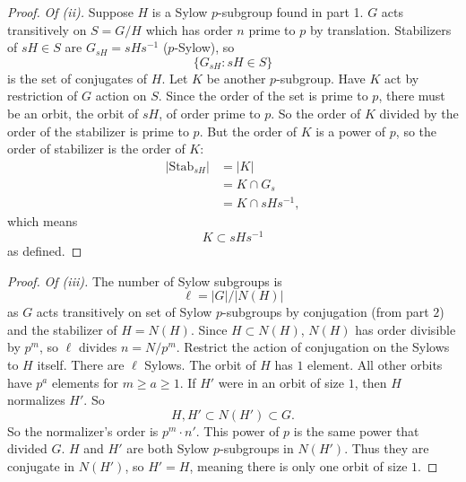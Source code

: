\documentclass[11pt, oneside]{amsart}
\numberwithin{equation}{section}
\numberwithin{theorem}{section}
\theoremstyle{definition}
\begin{document}
{\begin{proof} 
\textit{Of (ii).} Suppose $H$ is a Sylow $p$-subgroup found in part 1. $G$ acts transitively on $S=G/H$ which has order $n$ prime to $p$ by translation. Stabilizers of $sH\in S$ are $G_{sH} = sHs^{-1}$ ($p$-Sylow), so 
$$
\{ G_{sH} : sH\in S \}
$$
is the set of conjugates of $H$. Let $K$ be another $p$-subgroup. Have $K$ act by restriction of $G$ action on $S$. Since the order of the set is prime to $p$, there must be an orbit, the orbit of $sH$, of order prime to $p$. So the order of $K$ divided by the order of the stabilizer is prime to $p$. But the order of $K$ is a power of $p$, so the order of stabilizer is the order of $K$:
\begin{align*}
|\textrm{Stab}_{sH}| 	&= |K|\\
				&= K\cap G_s\\
				&= K \cap sHs^{-1},
\end{align*}
which means 
$$
K \subset sHs^{-1}
$$
as defined.
\end{proof}

\begin{proof} 
\textit{Of (iii).} The number of Sylow subgroups is
$$
\ell = |G| / |N(H)|
$$ 
as $G$ acts transitively on set of Sylow $p$-subgroups by conjugation (from part $2$) and the stabilizer of $H=N(H)$. Since $H\subset N(H)$, $N(H)$ has order divisible by $p^m$, so $\ell$ divides $n = N/p^m$. Restrict the action of conjugation on the Sylows to $H$ itself. There are $\ell$ Sylows. The orbit of $H$ has $1$ element. All other orbits have $p^a$ elements for $m\geqslant a\geqslant 1$. If $H'$ were in an orbit of size $1$, then $H$ normalizes $H'$. So 
$$
H, H' \subset N(H')\subset G.
$$
So the normalizer's order is $p^m\cdot n'$. This power of $p$ is the same power that divided $G$. $H$ and $H'$ are both Sylow $p$-subgroups in $N(H')$. Thus they are conjugate in $N(H')$, so $H'=H$, meaning there is only one orbit of size $1$.
\end{proof}

}
\end{document}

